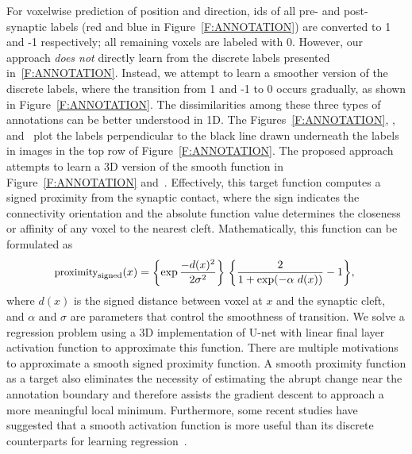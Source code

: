 \documentclass{llncs}
\begin{document}
For voxelwise prediction of position and direction, ids of all pre- and post-synaptic labels (red and blue in Figure~\ref{F:ANNOTATION}) are converted to 1 and -1 respectively; all remaining voxels are labeled with 0. However, our approach \emph{does not} directly learn from the discrete labels presented in~\ref{F:ANNOTATION}. Instead, we attempt to learn a smoother version of the discrete labels, where the transition from 1 and -1 to 0 occurs gradually, as shown in Figure~\ref{F:ANNOTATION}. The dissimilarities among these three types of annotations can be better understood in 1D. The Figures~\ref{F:ANNOTATION}, , and~ plot the labels perpendicular to the black line drawn underneath the labels in images in the top row of Figure~\ref{F:ANNOTATION}. The proposed approach attempts to learn a 3D version of the smooth function in Figure~\ref{F:ANNOTATION} and~. Effectively, this target function computes a signed proximity from the synaptic contact, where the sign indicates the connectivity orientation and the absolute function value determines the closeness or affinity of any voxel to the nearest cleft. Mathematically, this function can be formulated as
\vspace{-0.2cm}
\begin{equation}
\small \text{proximity}_\text{signed}(x) = \biggl \{\exp {- d(x)^2 \over {2 \sigma^2}} \biggr \} ~ \biggl \{ {2 \over {1 + \exp( - \alpha~ d(x))}} - 1 \biggr \}, ~ 
\vspace{-0.2cm}
\end{equation}
where $d(x)$ is the signed distance between voxel at $x$ and the synaptic cleft, and $\alpha$ and $\sigma$ are parameters that control the smoothness of transition. We solve a regression problem using a 3D implementation of U-net with linear final layer activation function to approximate this function.  There are multiple motivations to approximate a smooth signed proximity function. A smooth proximity function as a target also eliminates the necessity of estimating the abrupt change near the annotation boundary and therefore assists the gradient descent to approach a more meaningful local minimum.  Furthermore, some recent studies have suggested that a smooth activation function is more useful than its discrete counterparts for learning regression~\cite{hou17smooth}\cite{mobahi16}.  
\end{document}
